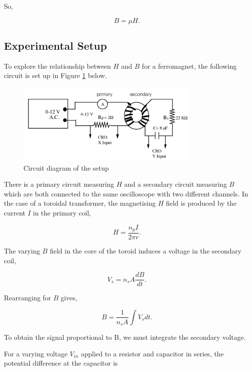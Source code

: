 \documentclass{article}
\begin{document}
So,

\begin{equation}
    B = \mu H.
\end{equation}

\subsection{Experimental Setup}
To explore the relationship between $H$ and $B$ for a ferromagnet, the following circuit is set up in
Figure \ref{fig:circuit} below.

\begin{figure}[H]
    \centering
    \includegraphics[width=0.8\textwidth]{circuit.png}
    \caption{Circuit diagram of the setup}
    \label{fig:circuit}
\end{figure}

There is a primary circuit measuring $H$ and a secondary circuit measuring $B$ which are both connected
to the same oscilloscope with two different channels. In the case of a toroidal transformer, the magnetising
$H$ field is produced by the current $I$ in the primary coil,

\begin{equation}
    H = \frac{n_pI}{2\pi r}.
\end{equation}

The varying $B$ field in the core of the toroid induces a voltage in the secondary coil,

\begin{equation}
    V_s = n_sA\frac{dB}{dt}.
\end{equation}

Rearranging for $B$ gives,

\begin{equation}
    B = \frac{1}{n_s A} \int V_s dt.
\end{equation}

To obtain the signal proportional to B, we must integrate the secondary voltage.

For a varying voltage $V_{in}$ applied to a resistor and capacitor in series, the
potential difference at the capacitor is
\end{document}

